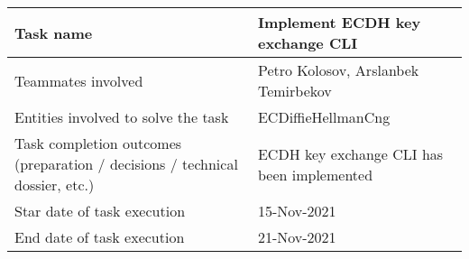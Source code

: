 \begin{tabular}{|p{}|p{}|}
    \hline
    Task name                                                                    & Implement ECDH key exchange CLI            \\
    \hline
    Teammates involved                                                           & Petro Kolosov, Arslanbek Temirbekov        \\
    \hline
    Entities involved to solve the task                                          & ECDiffieHellmanCng                         \\
    \hline
    Task completion outcomes (preparation / decisions / technical dossier, etc.) & ECDH key exchange CLI has been implemented \\
    \hline
    Star date of task execution                                                  & 15-Nov-2021                                \\
    \hline
    End date of task execution                                                   & 21-Nov-2021                                \\
    \hline
\end{tabular}